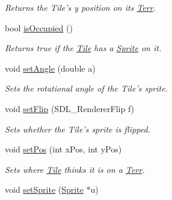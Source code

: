 \begin{DoxyCompactItemize}
\begin{DoxyCompactList}\small\item\em Returns the Tile’s y position on its \hyperlink{class_terr}{Terr}. \end{DoxyCompactList}\item 
bool \hyperlink{class_tile_ac556e7bbe293dde62d66b46e3d12bcb7}{is\+Occupied} ()\hypertarget{class_tile_ac556e7bbe293dde62d66b46e3d12bcb7}{}\label{class_tile_ac556e7bbe293dde62d66b46e3d12bcb7}

\begin{DoxyCompactList}\small\item\em Returns true if the \hyperlink{class_tile}{Tile} has a \hyperlink{class_sprite}{Sprite} on it. \end{DoxyCompactList}\item 
void \hyperlink{class_tile_a94f9e2d35e55c1d1b9f56dbd7816f51a}{set\+Angle} (double a)\hypertarget{class_tile_a94f9e2d35e55c1d1b9f56dbd7816f51a}{}\label{class_tile_a94f9e2d35e55c1d1b9f56dbd7816f51a}

\begin{DoxyCompactList}\small\item\em Sets the rotational angle of the Tile’s sprite. \end{DoxyCompactList}\item 
void \hyperlink{class_tile_a801a349b0e7f7500b60af91e5e821f2e}{set\+Flip} (S\+D\+L\+\_\+\+Renderer\+Flip f)\hypertarget{class_tile_a801a349b0e7f7500b60af91e5e821f2e}{}\label{class_tile_a801a349b0e7f7500b60af91e5e821f2e}

\begin{DoxyCompactList}\small\item\em Sets whether the Tile’s sprite is flipped. \end{DoxyCompactList}\item 
void \hyperlink{class_tile_a8a6429d2adbe3e45c519d86a57b514c3}{set\+Pos} (int x\+Pos, int y\+Pos)\hypertarget{class_tile_a8a6429d2adbe3e45c519d86a57b514c3}{}\label{class_tile_a8a6429d2adbe3e45c519d86a57b514c3}

\begin{DoxyCompactList}\small\item\em Sets where \hyperlink{class_tile}{Tile} thinks it is on a \hyperlink{class_terr}{Terr}. \end{DoxyCompactList}\item 
void \hyperlink{class_tile_ad85c92ea426639130cc1d0d38641da3c}{set\+Sprite} (\hyperlink{class_sprite}{Sprite} $\ast$u)\hypertarget{class_tile_ad85c92ea426639130cc1d0d38641da3c}{}\label{class_tile_ad85c92ea426639130cc1d0d38641da3c}


\end{DoxyCompactItemize}
